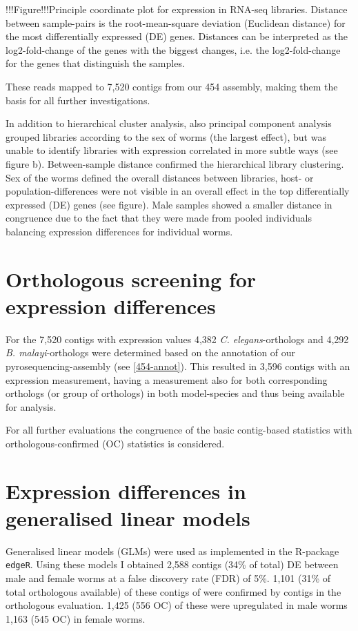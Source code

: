 \documentclass[10pt]{article}
\begin{document}
!!!Figure!!!Principle coordinate plot for expression in RNA-seq
libraries. Distance between sample-pairs is the root-mean-square
deviation (Euclidean distance) for the most differentially expressed
(DE) genes. Distances can be interpreted as the log2-fold-change of
the genes with the biggest changes, i.e. the log2-fold-change for the
genes that distinguish the samples.

These reads mapped to 7,520 contigs from our 454 assembly, making them
the basis for all further investigations.

In addition to hierarchical cluster analysis, also principal component
analysis grouped libraries according to the sex of worms (the largest
effect), but was unable to identify libraries with expression
correlated in more subtle ways (see figure b). Between-sample distance
confirmed the hierarchical library clustering. Sex of the worms
defined the overall distances between libraries, host- or
population-differences were not visible in an overall effect in the
top differentially expressed (DE) genes (see figure). Male samples
showed a smaller distance in congruence due to the fact that they were
made from pooled individuals balancing expression differences for
individual worms.

\section{Orthologous screening for expression differences}

For the 7,520 contigs with expression values 4,382
\textit{C. elegans}-orthologs and 4,292 \textit{B. malayi}-orthologs
were determined based on the annotation of our pyrosequencing-assembly
(see \ref{454-annot}). This resulted in 3,596 contigs with an
expression measurement, having a measurement also for both
corresponding orthologs (or group of orthologs) in both model-species
and thus being available for analysis.

For all further evaluations the congruence of the basic contig-based
statistics with orthologous-confirmed (OC) statistics is considered.

\section{Expression differences in generalised linear models}

Generalised linear models (GLMs) were used as implemented in the
R-package \texttt{edgeR}. Using these models I obtained 2,588 contigs
(34\% of total) DE between male and female worms at a false discovery
rate (FDR) of 5\%. 1,101 (31\% of total orthologous available) of
these contigs of were confirmed by contigs in the orthologous
evaluation. 1,425 (556 OC) of these were upregulated in male worms
1,163 (545 OC) in female worms.
\end{document}

